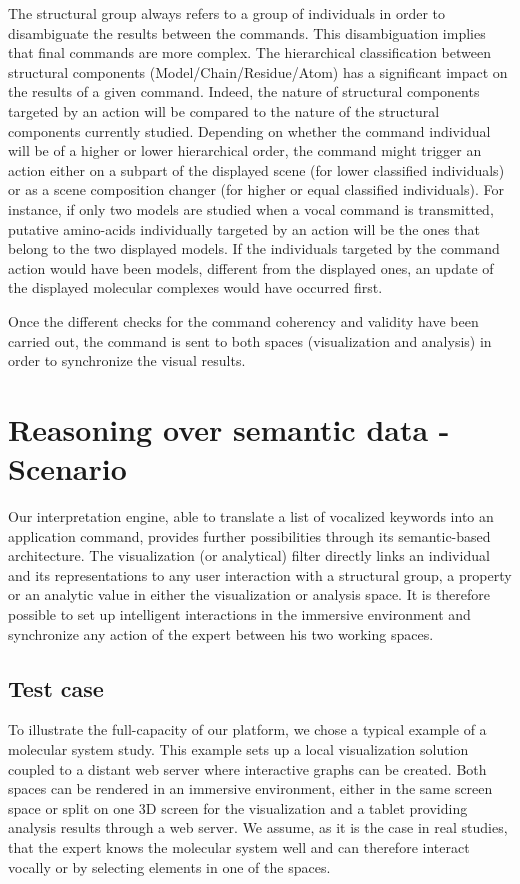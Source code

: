 \documentclass{vgtc}                          %
\begin{document}
The structural group always refers to a group of individuals in order to disambiguate the results between the commands. 
This disambiguation implies that final commands are more complex.
The hierarchical classification between structural components (Model/Chain/Residue/Atom) has a significant impact on the results of a given command. 
Indeed, the nature of structural components targeted by an action will be compared to the nature of the structural components currently studied. 
Depending on whether the command individual will be of a higher or lower hierarchical order, the command might trigger an action either on a subpart of the displayed scene (for lower classified individuals) or as a scene composition changer (for higher or equal classified individuals).
For instance, if only two models are studied when a vocal command is transmitted, putative amino-acids individually targeted by an action will be the ones that belong to the two displayed models. If the individuals targeted by the command action would have been models, different from the displayed ones, an update of the displayed molecular complexes would have occurred first.

Once the different checks for the command coherency and validity have been carried out, the command is sent to both spaces (visualization and analysis) in order to synchronize the visual results.

\section{Reasoning over semantic data - Scenario}

Our interpretation engine, able to translate a list of vocalized keywords into an application command, provides further possibilities through its semantic-based architecture. The visualization (or analytical) filter directly links an individual and its representations to any user interaction with a structural group, a property or an analytic value in either the visualization or analysis space. It is therefore possible to set up intelligent interactions in the immersive environment and synchronize any action of the expert between his two working spaces.

\subsection{Test case}

To illustrate the full-capacity of our platform, we chose a typical example of a molecular system study. This example sets up a local visualization solution coupled to a distant web server where interactive graphs can be created. Both spaces can be rendered in an immersive environment, either in the same screen space or split on one 3D screen for the visualization and a tablet providing analysis results through a web server. We assume, as it is the case in real studies, that the expert knows the molecular system well and can therefore interact vocally or by selecting elements in one of the spaces.
\end{document}
